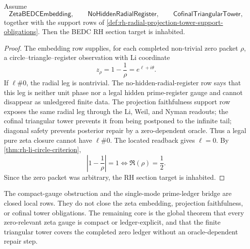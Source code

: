 \begin{theorem}
\label{thm:rh-radial-obstruction-package-conditionally-sufficient}
Assume
$$
\mathsf{ZetaBEDCEmbedding},
\qquad
\mathsf{NoHiddenRadialRegister},
\qquad
\mathsf{CofinalTriangularTower},
$$
together with the support rows of
\autoref{def:rh-radial-projection-tower-support-obligations}. Then the
BEDC RH section target is inhabited.
\end{theorem}

\begin{proof}
The embedding row supplies, for each completed non-trivial zero packet
$\rho$, a circle--triangle--register observation with Li coordinate
$$
z_{\rho}=1-\frac1{\rho}=e^{\ell+i\theta}.
$$
If $\ell\#0$, the radial leg is nontrivial. The no-hidden-radial-register
row says that this leg is neither unit phase nor a legal hidden
prime-register gauge and cannot disappear as unledgered finite data. The
projection faithfulness support row exposes the same radial leg through
the Li, Weil, and Nyman readouts; the cofinal triangular tower prevents
it from being postponed to the infinite tail; diagonal safety prevents
posterior repair by a zero-dependent oracle. Thus a legal pure zeta
closure cannot have $\ell\#0$. The located readback gives $\ell=0$.
By \autoref{thm:rh-li-circle-criterion},
$$
\left|1-\frac1{\rho}\right|=1
\Longleftrightarrow
\Re(\rho)=\frac12.
$$
Since the zero packet was arbitrary, the RH section target is inhabited.
\end{proof}

\begin{principle}
\label{prin:rh-radial-obstruction-frontier-status}
The compact-gauge obstruction and the single-mode prime-ledger bridge are
closed local rows. They do not close the zeta embedding, projection
faithfulness, or cofinal tower obligations. The remaining core is the
global theorem that every zero-relevant zeta gauge is compact or
ledger-explicit, and that the finite triangular tower covers the
completed zero ledger without an oracle-dependent repair step.
\end{principle}
